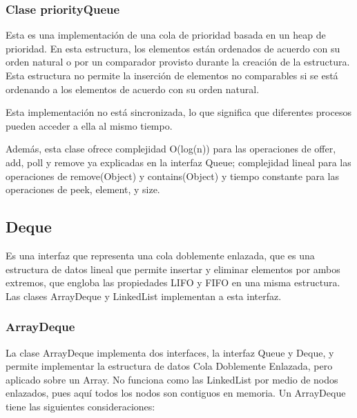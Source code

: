 \documentclass[11pt]{article}
\begin{document}
\subsubsection{Clase priorityQueue}

\par

Esta es una implementación de una cola de prioridad basada en un heap 
de prioridad. En esta estructura, los elementos están ordenados de 
acuerdo con su orden natural o por un comparador provisto durante la 
creación de la estructura.  Esta estructura no permite la inserción 
de elementos no comparables si se está ordenando a los elementos de 
acuerdo con su orden natural.

\par

Esta implementación no está sincronizada, lo que significa que 
diferentes procesos pueden acceder a ella al mismo tiempo.

\par

Además, esta clase ofrece complejidad O(log(n)) para las operaciones 
de offer, add, poll y remove ya explicadas en la interfaz Queue; 
complejidad lineal para las operaciones de remove(Object) y 
contains(Object) y tiempo constante para las operaciones de peek, 
element, y size.

\subsection{Deque}

\par

Es una interfaz que representa una cola doblemente enlazada, que es 
una estructura de datos lineal que permite insertar y eliminar 
elementos por ambos extremos, que engloba las propiedades LIFO y FIFO 
en una misma estructura. Las clases ArrayDeque y LinkedList 
implementan a esta interfaz. 

\subsubsection{ArrayDeque}

\par

La clase ArrayDeque implementa dos interfaces, la interfaz Queue y 
Deque, y permite implementar la estructura de datos Cola Doblemente 
Enlazada, pero aplicado sobre un Array. No funciona como las 
LinkedList por medio de nodos enlazados, pues aquí todos los nodos 
son contiguos en memoria. Un ArrayDeque tiene las siguientes 
consideraciones:
\end{document}
